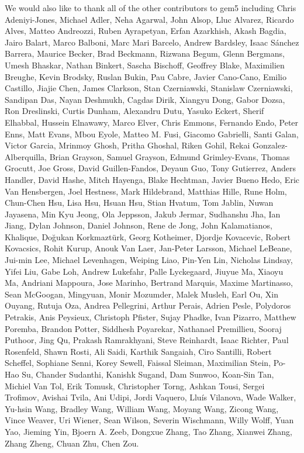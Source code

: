 \documentclass[sigconf,nonacm,screen=true]{acmart}
\begin{document}
We would also like to thank all of the other contributors to gem5 including
Chris Adeniyi-Jones, Michael Adler, Neha Agarwal, John Alsop, Lluc Alvarez, Ricardo Alves, Matteo Andreozzi, Ruben Ayrapetyan, Erfan Azarkhish, Akash Bagdia, Jairo Balart, Marco Balboni, Marc Mari Barcelo, Andrew Bardsley, Isaac S\'anchez Barrera, Maurice Becker, Brad Beckmann, Rizwana Begum, Glenn Bergmans, Umesh Bhaskar, Nathan Binkert, Sascha Bischoff, Geoffrey Blake, Maximilien Breughe, Kevin Brodsky, Ruslan Bukin, Pau Cabre, Javier Cano-Cano, Emilio Castillo, Jiajie Chen, James Clarkson, Stan Czerniawski, Stanislaw Czerniawski, Sandipan Das, Nayan Deshmukh, Cagdas Dirik, Xiangyu Dong, Gabor Dozsa, Ron Dreslinski, Curtis Dunham, Alexandru Dutu, Yasuko Eckert, Sherif Elhabbal, Hussein Elnawawy, Marco Elver, Chris Emmons, Fernando Endo, Peter Enns, Matt Evans, Mbou Eyole, Matteo M. Fusi, Giacomo Gabrielli, Santi Galan, Victor Garcia, Mrinmoy Ghosh, Pritha Ghoshal, Riken Gohil, Rekai Gonzalez-Alberquilla, Brian Grayson, Samuel Grayson, Edmund Grimley-Evans, Thomas Grocutt, Joe Gross, David Guillen-Fandos, Deyaun Guo, Tony Gutierrez, Anders Handler, David Hashe, Mitch Hayenga, Blake Hechtman, Javier Bueno Hedo, Eric Van Hensbergen, Joel Hestness, Mark Hildebrand, Matthias Hille, Rune Holm, Chun-Chen Hsu, Lisa Hsu, Hsuan Hsu, Stian Hvatum, Tom Jablin, Nuwan Jayasena, Min Kyu Jeong, Ola Jeppsson, Jakub Jermar, Sudhanshu Jha, Ian Jiang, Dylan Johnson, Daniel Johnson, Rene de Jong, John Kalamatianos, Khalique, Do\u{g}ukan Korkmazt\"urk, Georg Kotheimer, Djordje Kovacevic, Robert Kovacsics, Rohit Kurup, Anouk Van Laer, Jan-Peter Larsson, Michael LeBeane, Jui-min Lee, Michael Levenhagen, Weiping Liao, Pin-Yen Lin, Nicholas Lindsay, Yifei Liu, Gabe Loh, Andrew Lukefahr, Palle Lyckegaard, Jiuyue Ma, Xiaoyu Ma, Andriani Mappoura, Jose Marinho, Bertrand Marquis, Maxime Martinasso, Sean McGoogan, Mingyuan, Monir Mozumder, Malek Musleh, Earl Ou, Xin Ouyang, Rutuja Oza, Andrea Pellegrini, Arthur Perais, Adrien Pesle, Polydoros Petrakis, Anis Peysieux, Christoph Pfister, Sujay Phadke, Ivan Pizarro, Matthew Poremba, Brandon Potter, Siddhesh Poyarekar, Nathanael Premillieu, Sooraj Puthoor, Jing Qu, Prakash Ramrakhyani, Steve Reinhardt, Isaac Richter, Paul Rosenfeld, Shawn Rosti, Ali Saidi, Karthik Sangaiah, Ciro Santilli, Robert Scheffel, Sophiane Senni, Korey Sewell, Faissal Sleiman, Maximilian Stein, Po-Hao Su, Chander Sudanthi, Kanishk Sugand, Dam Sunwoo, Koan-Sin Tan, Michiel Van Tol, Erik Tomusk, Christopher Torng, Ashkan Tousi, Sergei Trofimov, Avishai Tvila, Ani Udipi, Jordi Vaquero, Llu\'is Vilanova, Wade Walker, Yu-hsin Wang, Bradley Wang, William Wang, Moyang Wang, Zicong Wang, Vince Weaver, Uri Wiener, Sean Wilson, Severin Wischmann, Willy Wolff, Yuan Yao, Jieming Yin, Bjoern A. Zeeb, Dongxue Zhang, Tao Zhang, Xianwei Zhang, Zhang Zheng, Chuan Zhu, Chen Zou.



\end{document}
